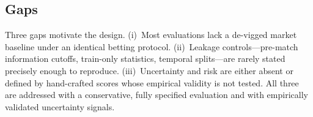 \subsection{Gaps}
Three gaps motivate the design. (i)~Most evaluations lack a
de-vigged market baseline under an identical betting protocol.
(ii)~Leakage controls---pre-match information cutoffs, train-only
statistics, temporal splits---are rarely stated precisely enough to
reproduce. (iii)~Uncertainty and risk are either absent or defined by
hand-crafted scores whose empirical validity is not tested. All
three are addressed with a conservative, fully specified evaluation
and with empirically validated uncertainty signals.
